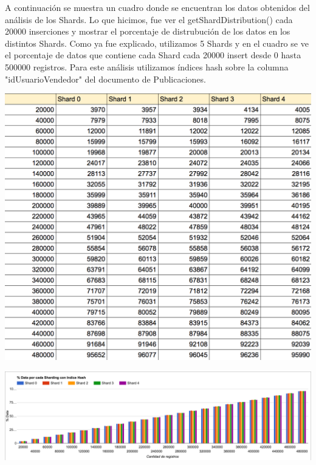 \documentclass[a4paper, 10pt, twoside]{article}
\begin{document}
A continuaci\'on se muestra un cuadro donde se encuentran los datos obtenidos del an\'alisis de los Shards. Lo que hicimos, fue ver el getShardDistribution() cada 20000 inserciones y mostrar el porcentaje de distrubuci\'on de los datos en los distintos Shards.
Como ya fue explicado, utilizamos 5 Shards y en el cuadro se ve el porcentaje de datos que contiene cada Shard cada 20000 insert desde 0 hasta 500000 registros.
Para este an\'alisis utilizamos \'indices hash sobre la columna "idUsuarioVendedor" del documento de Publicaciones.


\begin{center}
\includegraphics[scale=0.7]{tabla_hash.png}
\end{center}
\includegraphics[scale=0.4]{grafico_hash.png}




\end{document}
